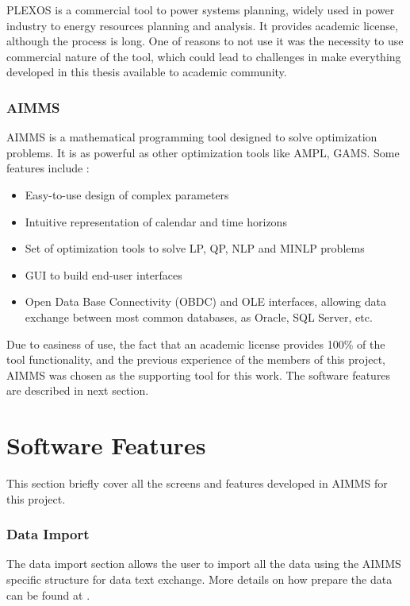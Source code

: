 \documentclass[12pt,LUDisStyle,twosided]{book}
\begin{document}
PLEXOS \textregistered is a commercial tool to power systems planning, widely used in power industry to energy resources planning and analysis. It provides academic license, although the process is long. One of reasons to not use it was the necessity to use commercial nature of the tool, which could lead to challenges in make everything developed in this thesis available to academic community.  

\subsubsection{AIMMS}


AIMMS is a mathematical programming tool designed to solve optimization problems. It is as powerful as other optimization tools like AMPL, GAMS. Some features include \cite{bisschop}:

\begin{itemize}
\item Easy-to-use design of complex parameters
\item Intuitive representation of calendar and time horizons
\item Set of optimization tools to solve LP, QP, NLP and MINLP problems
\item GUI to build end-user interfaces
\item Open Data Base Connectivity (OBDC) and OLE interfaces, allowing data exchange between most common databases, as Oracle, SQL Server, etc.
\end{itemize}

Due to easiness of use, the fact that an academic license provides 100\% of the tool functionality, and the previous experience of the members of this project, AIMMS was chosen as the supporting tool for this work. The software features are described in next section.

\section{Software Features}

This section briefly cover all the screens and features developed in AIMMS for this project.

\subsubsection{Data Import}

The data import section allows the user to import all the data using the AIMMS specific structure for data text exchange. More details on how prepare the data can be found at \cite{bisschop}.
\end{document}

